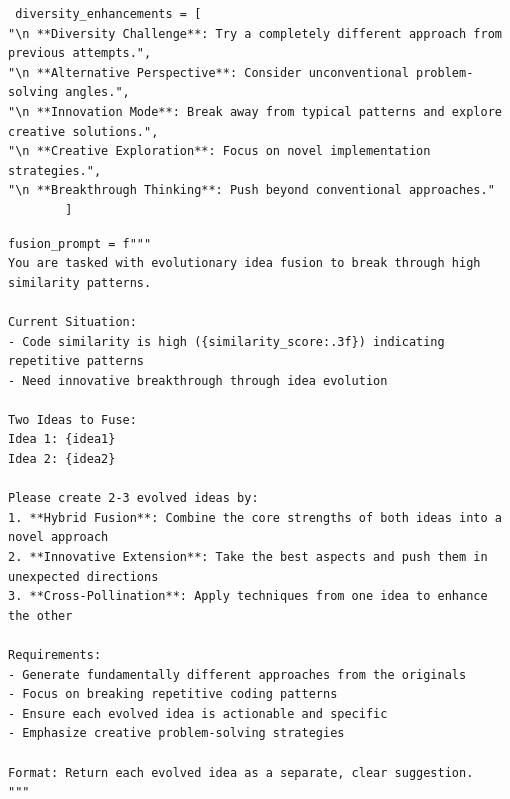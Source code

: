 \documentclass{article} %
\theoremstyle{definition}
\theoremstyle{remark}
\begin{document}
\begin{tcolorbox}[notitle, sharp corners, breakable, colframe=black, colback=white, 
       boxrule=3pt, boxsep=0.5pt, enhanced, 
       shadow={3pt}{-3pt}{0pt}{opacity=1,mygrey},
       title={Diversity-enhancing Tips},]\label{box:tag-generate}
       \scriptsize
       
\begin{lstlisting}
 diversity_enhancements = [
"\n **Diversity Challenge**: Try a completely different approach from previous attempts.",
"\n **Alternative Perspective**: Consider unconventional problem-solving angles.",
"\n **Innovation Mode**: Break away from typical patterns and explore creative solutions.",
"\n **Creative Exploration**: Focus on novel implementation strategies.",
"\n **Breakthrough Thinking**: Push beyond conventional approaches."
        ]
\end{lstlisting}
\end{tcolorbox}







\begin{tcolorbox}[notitle, sharp corners, breakable, colframe=black, colback=white, 
       boxrule=3pt, boxsep=0.5pt, enhanced, 
       shadow={3pt}{-3pt}{0pt}{opacity=1,mygrey},
       title={Idea Fusion Prompt},]\label{box:tag-generate}
       \scriptsize
       
\begin{lstlisting}
fusion_prompt = f"""
You are tasked with evolutionary idea fusion to break through high similarity patterns.

Current Situation:
- Code similarity is high ({similarity_score:.3f}) indicating repetitive patterns
- Need innovative breakthrough through idea evolution

Two Ideas to Fuse:
Idea 1: {idea1}
Idea 2: {idea2}

Please create 2-3 evolved ideas by:
1. **Hybrid Fusion**: Combine the core strengths of both ideas into a novel approach
2. **Innovative Extension**: Take the best aspects and push them in unexpected directions  
3. **Cross-Pollination**: Apply techniques from one idea to enhance the other

Requirements:
- Generate fundamentally different approaches from the originals
- Focus on breaking repetitive coding patterns
- Ensure each evolved idea is actionable and specific
- Emphasize creative problem-solving strategies

Format: Return each evolved idea as a separate, clear suggestion.
"""
\end{lstlisting}
\end{tcolorbox}
\end{document}
